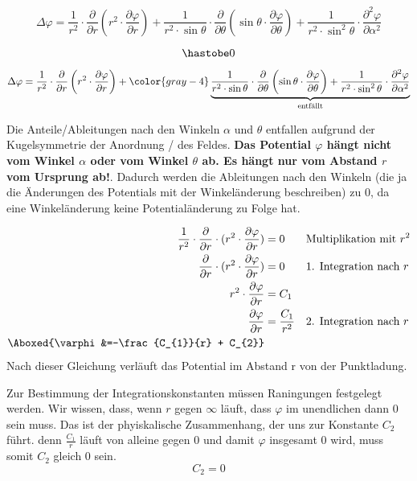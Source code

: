 \documentclass[11pt, a4paper]{article}
\begin{document}
\[\Delta \varphi = \frac{1}{r^{2}} \cdot \frac{\partial}{\partial r} \left(r^{2}\cdot \frac{\partial \varphi}{\partial r} \right) + \frac{1}{r^{2} \cdot \sin\theta}\cdot \frac{\partial}{\partial \theta} \left(\sin\theta \cdot \frac{\partial\varphi}{\partial\theta}\right)+\frac{1}{r^{2}\cdot \sin^{2}\theta}\cdot \frac{\partial^{2}\varphi}{\partial \alpha^{2}}\]

\[\hastobe 0\]

\[\Delta \varphi = \frac{1}{r^{2}} \cdot \frac{\partial}{\partial r} \left(r^{2}\cdot \frac{\partial \varphi}{\partial r} \right) + \color{gray-4}\underbrace{\frac{1}{r^{2} \cdot \sin\theta}\cdot \frac{\partial}{\partial \theta} \left(\sin\theta \cdot \frac{\partial\varphi}{\partial\theta}\right)+\frac{1}{r^{2}\cdot \sin^{2}\theta}\cdot \frac{\partial^{2}\varphi}{\partial \alpha^{2}}}_{\text{entfällt}}\]

Die Anteile/Ableitungen nach den Winkeln $\alpha$ und $\theta$ entfallen aufgrund der Kugelsymmetrie der Anordnung / des Feldes. \textbf{Das Potential $\varphi$ hängt nicht vom Winkel $\alpha$ oder vom Winkel $\theta$ ab. Es hängt nur vom Abstand $r$ vom Ursprung ab!}. Dadurch werden die Ableitungen nach den Winkeln (die ja die Änderungen des Potentials mit der Winkeländerung beschreiben) zu 0, da eine Winkeländerung keine Potentialänderung zu Folge hat.

\begin{align*}
\frac{1}{r^{2}} \cdot \frac{\partial}{\partial r} \cdot (r^{2}\cdot \frac{\partial \varphi}{\partial r}) &= 0 && \text{Multiplikation mit } r^{2}\\
\frac{\partial}{\partial r} \cdot (r^{2}\cdot \frac{\partial \varphi}{\partial r}) &= 0 && \text{1. Integration nach } r\\
r^{2}\cdot \frac{\partial \varphi}{\partial r} &= C_{1}\\
\frac{\partial \varphi}{\partial r} &= \frac{C_{1}}{r^{2}} && \text{2. Integration nach }r\\
\Aboxed{\varphi&=-\frac{C_{1}}{r} + C_{2}}
\end{align*}
Nach dieser Gleichung verläuft das Potential im Abstand r von der Punktladung.\\


Zur Bestimmung der Integrationskonstanten müssen Raningungen festgelegt werden. Wir wissen, dass, wenn $r$ gegen $\infty$ läuft, dass $\varphi$ im unendlichen dann 0 sein muss. Das ist der phyiskalische Zusammenhang, der uns zur Konstante $C_{2}$ führt. denn $\frac{C_{1}}{r}$ läuft von alleine gegen 0 und damit $\varphi$ insgesamt 0 wird, muss somit $C_{2}$ gleich 0 sein.
\[C_{2} = 0\]
\end{document}

